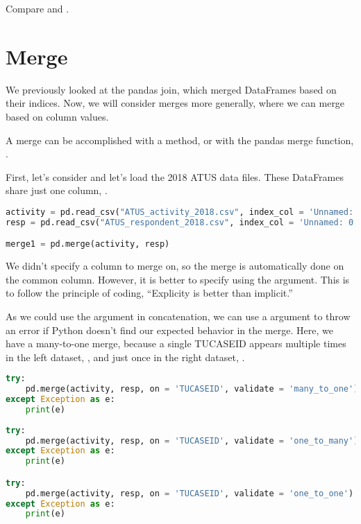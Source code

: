 Compare 
and .


\section{Merge}
We previously looked at the pandas join, which merged DataFrames based on their indices. Now, we will consider merges more generally, where we can merge based on column values. 

A merge can be accomplished with a  method,  or with the pandas merge function, .

First, let's consider  and let's load the 2018 ATUS data files. These DataFrames share just one column, .

\begin{lstlisting}[language = Python]
activity = pd.read_csv("ATUS_activity_2018.csv", index_col = 'Unnamed: 0')
resp = pd.read_csv("ATUS_respondent_2018.csv", index_col = 'Unnamed: 0')

merge1 = pd.merge(activity, resp) 
\end{lstlisting}

We didn't specify a column to merge on, so the merge is automatically done on the common column. However, it is better to specify using the  argument. This is to follow the principle of coding, ``Explicity is better than implicit.''

As we could use the  argument in concatenation, we can use a  argument to throw an error if Python doesn't find our expected behavior in the merge. Here, we have a many-to-one merge, because a single TUCASEID appears multiple times in the left dataset, , and just once in the right dataset, .

\begin{lstlisting}[language = Python]
try:
    pd.merge(activity, resp, on = 'TUCASEID', validate = 'many_to_one')
except Exception as e:
    print(e)
    
try:
    pd.merge(activity, resp, on = 'TUCASEID', validate = 'one_to_many')
except Exception as e:
    print(e)

try:
    pd.merge(activity, resp, on = 'TUCASEID', validate = 'one_to_one')
except Exception as e:
    print(e)
\end{lstlisting}

